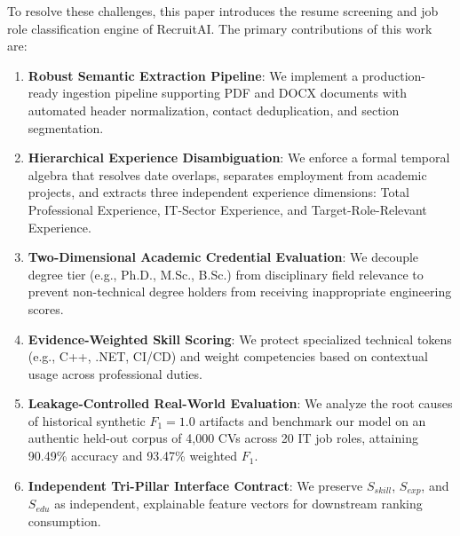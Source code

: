 \documentclass[conference]{IEEEtran}
\begin{document}
To resolve these challenges, this paper introduces the resume screening and job role classification engine of RecruitAI. The primary contributions of this work are:
\begin{enumerate}
    \item \textbf{Robust Semantic Extraction Pipeline}: We implement a production-ready ingestion pipeline supporting PDF and DOCX documents with automated header normalization, contact deduplication, and section segmentation.
    \item \textbf{Hierarchical Experience Disambiguation}: We enforce a formal temporal algebra that resolves date overlaps, separates employment from academic projects, and extracts three independent experience dimensions: Total Professional Experience, IT-Sector Experience, and Target-Role-Relevant Experience.
    \item \textbf{Two-Dimensional Academic Credential Evaluation}: We decouple degree tier (e.g., Ph.D., M.Sc., B.Sc.) from disciplinary field relevance to prevent non-technical degree holders from receiving inappropriate engineering scores.
    \item \textbf{Evidence-Weighted Skill Scoring}: We protect specialized technical tokens (e.g., C++, .NET, CI/CD) and weight competencies based on contextual usage across professional duties.
    \item \textbf{Leakage-Controlled Real-World Evaluation}: We analyze the root causes of historical synthetic $F_1=1.0$ artifacts and benchmark our model on an authentic held-out corpus of 4,000 CVs across 20 IT job roles, attaining 90.49\% accuracy and 93.47\% weighted $F_1$.
    \item \textbf{Independent Tri-Pillar Interface Contract}: We preserve $S_{skill}$, $S_{exp}$, and $S_{edu}$ as independent, explainable feature vectors for downstream ranking consumption.
\end{enumerate}
\end{document}
